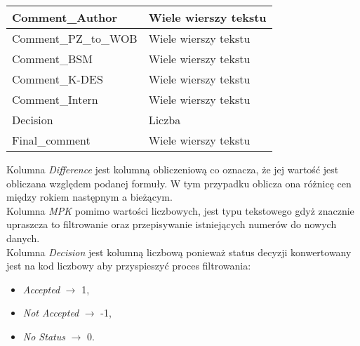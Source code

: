 \begin{table}[h]
\begin{tabular}{|l|l|}
        Comment\_Author            & Wiele wierszy tekstu     \\ \hline
        Comment\_PZ\_to\_WOB       & Wiele wierszy tekstu     \\ \hline
        Comment\_BSM               & Wiele wierszy tekstu     \\ \hline
        Comment\_K-DES             & Wiele wierszy tekstu     \\ \hline
        Comment\_Intern            & Wiele wierszy tekstu     \\ \hline
        Decision                   & Liczba                   \\ \hline
        Final\_comment             & Wiele wierszy tekstu     \\ \hline
    \end{tabular}
\end{table}

\noindent Kolumna \emph{Difference} jest kolumną obliczeniową co oznacza, że jej wartość jest obliczana względem podanej formuły. W tym przypadku oblicza ona różnicę cen między rokiem następnym a bieżącym. \\
Kolumna \emph{MPK} pomimo wartości liczbowych, jest typu tekstowego gdyż znacznie upraszcza to filtrowanie oraz przepisywanie istniejących numerów do nowych danych. \\
Kolumna \emph{Decision} jest kolumną liczbową ponieważ status decyzji konwertowany jest na kod liczbowy aby przyspieszyć proces filtrowania:
\begin{itemize}
    \item \emph{Accepted} $\rightarrow$ 1,
    \item \emph{Not Accepted} $\rightarrow$ -1,
    \item \emph{No Status} $\rightarrow$ 0.
\end{itemize}



